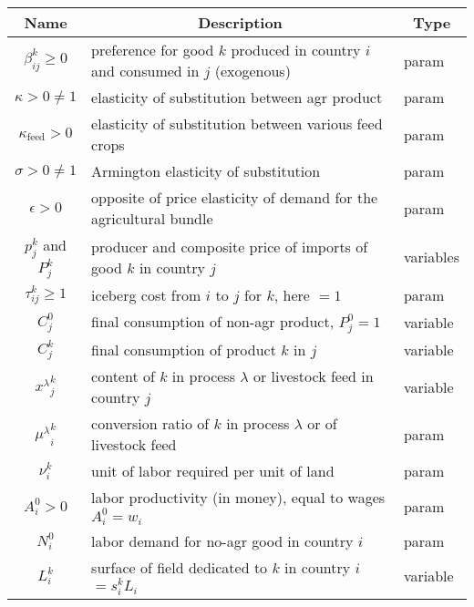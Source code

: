 \begin{tabular}{c|l|l}
\multicolumn{1}{c}{Name} & \multicolumn{1}{|c|}{Description}  & \multicolumn{1}{c}{Type} \\
\hline
    $\beta_{ij}^k \ge 0$ & preference for good $k$ produced in country $i$ and consumed in $j$ (exogenous) & param \\

    $\kappa > 0 \neq 1$ & elasticity of substitution between agr product & param \\

    $\kappa_{\text{feed}} > 0$ & elasticity of substitution between various feed crops & param \\

    $\sigma > 0 \neq 1$ & Armington elasticity of substitution & param \\

    $\epsilon > 0$ & opposite of price elasticity of demand for the agricultural bundle & param \\

    $p_j^k$ and $P_j^k$ & producer and composite price of imports of good $k$ in country $j$ & variables \\

    $\tau_{ij}^k \ge 1$ & iceberg cost from $i$ to $j$ for $k$, here $=1$ & param \\

    $C_j^0$ & final consumption of non-agr product, $P_j^0 = 1$ & variable \\

    $C_j^k$ & final consumption of product $k$ in $j$ & variable \\

    ${{x^\lambda}_j^k}$ & content of $k$ in process $\lambda$ or livestock feed in country $j$ & variable \\

    ${{\mu^\lambda}_i^k}$ & conversion ratio of $k$ in process $\lambda$ or of livestock feed & param \\

    $\nu_i^k$ & unit of labor required per unit of land & param \\

    $A_i^0 > 0$ & labor productivity (in money), equal to wages $A_i^0 = w_i$ & param \\

    $N_i^0$ & labor demand for no-agr good in country $i$ & param\\

    $L_i^k$ & surface of field dedicated to $k$ in country $i$ $=s_i^k L_i$ & variable \\


\end{tabular}
